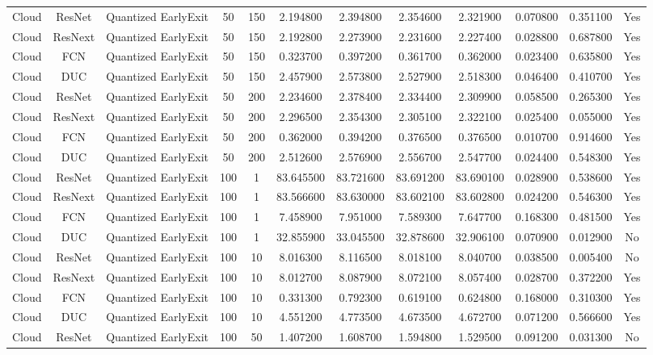 \begin{tabular}{|c||c||c||c||c||c||c||c||c||c||c||c|}
Cloud & ResNet & Quantized EarlyExit & 50 & 150 & 2.194800 & 2.394800 & 2.354600 & 2.321900 & 0.070800 & 0.351100 & Yes \\
Cloud & ResNext & Quantized EarlyExit & 50 & 150 & 2.192800 & 2.273900 & 2.231600 & 2.227400 & 0.028800 & 0.687800 & Yes \\
Cloud & FCN & Quantized EarlyExit & 50 & 150 & 0.323700 & 0.397200 & 0.361700 & 0.362000 & 0.023400 & 0.635800 & Yes \\
Cloud & DUC & Quantized EarlyExit & 50 & 150 & 2.457900 & 2.573800 & 2.527900 & 2.518300 & 0.046400 & 0.410700 & Yes \\
Cloud & ResNet & Quantized EarlyExit & 50 & 200 & 2.234600 & 2.378400 & 2.334400 & 2.309900 & 0.058500 & 0.265300 & Yes \\
Cloud & ResNext & Quantized EarlyExit & 50 & 200 & 2.296500 & 2.354300 & 2.305100 & 2.322100 & 0.025400 & 0.055000 & Yes \\
Cloud & FCN & Quantized EarlyExit & 50 & 200 & 0.362000 & 0.394200 & 0.376500 & 0.376500 & 0.010700 & 0.914600 & Yes \\
Cloud & DUC & Quantized EarlyExit & 50 & 200 & 2.512600 & 2.576900 & 2.556700 & 2.547700 & 0.024400 & 0.548300 & Yes \\
Cloud & ResNet & Quantized EarlyExit & 100 & 1 & 83.645500 & 83.721600 & 83.691200 & 83.690100 & 0.028900 & 0.538600 & Yes \\
Cloud & ResNext & Quantized EarlyExit & 100 & 1 & 83.566600 & 83.630000 & 83.602100 & 83.602800 & 0.024200 & 0.546300 & Yes \\
Cloud & FCN & Quantized EarlyExit & 100 & 1 & 7.458900 & 7.951000 & 7.589300 & 7.647700 & 0.168300 & 0.481500 & Yes \\
Cloud & DUC & Quantized EarlyExit & 100 & 1 & 32.855900 & 33.045500 & 32.878600 & 32.906100 & 0.070900 & 0.012900 & No \\
Cloud & ResNet & Quantized EarlyExit & 100 & 10 & 8.016300 & 8.116500 & 8.018100 & 8.040700 & 0.038500 & 0.005400 & No \\
Cloud & ResNext & Quantized EarlyExit & 100 & 10 & 8.012700 & 8.087900 & 8.072100 & 8.057400 & 0.028700 & 0.372200 & Yes \\
Cloud & FCN & Quantized EarlyExit & 100 & 10 & 0.331300 & 0.792300 & 0.619100 & 0.624800 & 0.168000 & 0.310300 & Yes \\
Cloud & DUC & Quantized EarlyExit & 100 & 10 & 4.551200 & 4.773500 & 4.673500 & 4.672700 & 0.071200 & 0.566600 & Yes \\
Cloud & ResNet & Quantized EarlyExit & 100 & 50 & 1.407200 & 1.608700 & 1.594800 & 1.529500 & 0.091200 & 0.031300 & No \\

\end{tabular}
